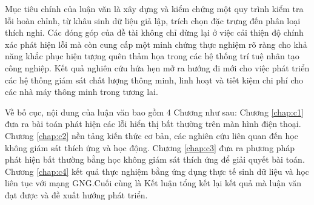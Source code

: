 Mục tiêu chính của luận văn là xây dựng và kiểm chứng một quy trình kiểm tra lỗi hoàn chỉnh, từ khâu sinh dữ liệu giả lập, trích chọn đặc trưng đến phân loại thích nghi. Các đóng góp của đề tài không chỉ dừng lại ở việc cải thiện độ chính xác phát hiện lỗi mà còn cung cấp một minh chứng thực nghiệm rõ ràng cho khả năng khắc phục hiện tượng quên thảm họa trong các hệ thống trí tuệ nhân tạo công nghiệp. Kết quả nghiên cứu hứa hẹn mở ra hướng đi mới cho việc phát triển các hệ thống giám sát chất lượng thông minh, linh hoạt và tiết kiệm chi phí cho các nhà máy thông minh trong tương lai.

Về bố cục, nội dung của luận văn bao gồm 4 Chương như sau: Chương \ref{chap:c1} đưa ra bài toán phát hiện các lỗi hiển thị bất thường trên màn hình điện thoại. Chương \ref{chap:c2} nền tảng kiến thức cơ bản, các nghiên cứu liên quan đến học không giám sát thích ứng và học động. Chương \ref{chap:c3} đưa ra phương pháp phát hiện bất thường bằng học không giám sát thích ứng để giải quyết bài toán. Chương \ref{chap:c4} kết quả thực nghiệm bằng ứng dụng thực tế sinh dữ liệu và học liên tục với mạng GNG.Cuối cùng là Kết luận tổng kết lại kết quả mà luận văn đạt được và đề xuất hướng phát triển. 
\cleardoublepage